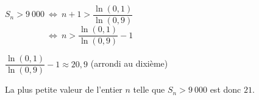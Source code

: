 \begin{corrige}
\begin{enumerate}
          $S_n > 9~000  ~\Leftrightarrow ~n+1 > \dfrac{\ln (0,1)}{\ln (0,9)}$ \\
          $\phantom{S_n > 9~000  ~}   \Leftrightarrow ~ n > \dfrac{\ln (0,1)}{\ln (0,9)} - 1$
          \par
          $\dfrac{\ln (0,1)}{\ln (0,9)} - 1 \approx 20,9$ (arrondi au dixième)
          \par
          La plus petite valeur de l'entier $n$ telle que $S_n > 9~000$ est donc $21$.
          \par
     \end{enumerate}
\end{corrige}
